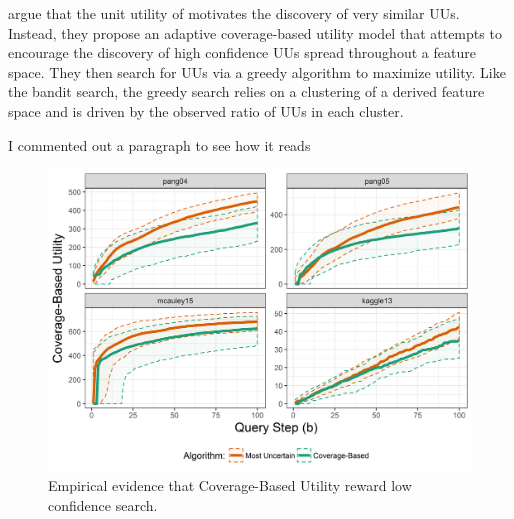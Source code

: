 \documentclass[letterpaper]{article} %
\newcommand{\wdb}[1]{{\color{blue} #1}} %
\begin{document}
\citet{Bansal2018} argue that the unit utility of \citet{Lakkaraju2016} motivates the discovery of very similar UUs. Instead, they propose an adaptive coverage-based utility model that attempts to encourage the discovery of high confidence UUs spread throughout a feature space. They then search for UUs via a greedy algorithm to maximize utility.  Like the bandit search, the greedy search relies on a clustering of a derived feature space and is driven by the observed ratio of UUs in each cluster. 










\wdb{I commented out a paragraph to see how it reads}

\begin{figure}[h!]
  \centering
  \includegraphics[width=\textwidth]{../experimentsAndPlots/CoverageVsMostUncertainPlaceholder.png}
  \caption{Empirical evidence that Coverage-Based Utility reward low confidence search.}
  \label{fig:coverutil}
\end{figure}
\end{document}

